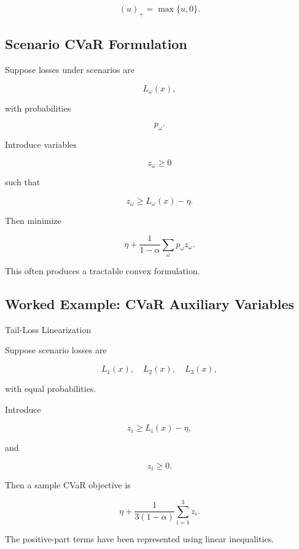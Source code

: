 \[
(u)_+
=
\max\{u,0\}.
\]

\subsection{Scenario CVaR Formulation}
\label{subsec:scenario-cvar-formulation}

Suppose losses under scenarios are

\[
L_\omega(x),
\]

with probabilities

\[
p_\omega.
\]

Introduce variables

\[
z_\omega\geq0
\]

such that

\[
\boxed{
z_\omega
\geq
L_\omega(x)-\eta.
}
\]

Then minimize

\[
\boxed{
\eta
+
\frac{
1
}{
1-\alpha
}
\sum_{\omega}
p_\omega z_\omega.
}
\]

This often produces a tractable convex formulation.

\subsection{Worked Example: CVaR Auxiliary Variables}
\label{subsec:worked-cvar}

\begin{workedexamplebox}{Tail-Loss Linearization}

Suppose scenario losses are

\[
L_1(x),
\quad
L_2(x),
\quad
L_3(x),
\]

with equal probabilities.

Introduce

\[
z_i
\geq
L_i(x)-\eta,
\]

and

\[
z_i\geq0.
\]

Then a sample CVaR objective is

\[
\boxed{
\eta
+
\frac{
1
}{
3(1-\alpha)
}
\sum_{i=1}^{3}
z_i.
}
\]

The positive-part terms have been represented using linear inequalities.

\end{workedexamplebox}

